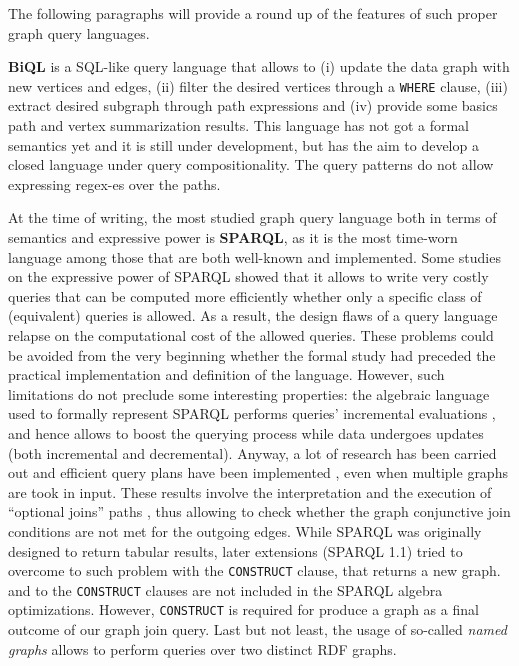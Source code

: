 The following paragraphs will provide a round up of the features of such proper graph query languages.


\textbf{BiQL} \cite{BiQL,BiQL2} is a SQL-like query language that allows to (i) update the data graph with new vertices
and edges, (ii) filter the desired vertices through a \texttt{WHERE} clause, (iii) extract desired subgraph through
path expressions and (iv) provide some basics path and vertex summarization results. This language has not got a
formal semantics yet and it is still under development, but has the aim to develop a closed language under query
compositionality. The query patterns do not allow expressing regex-es over the paths.


At the time of writing, the most studied graph query language  both in terms of
semantics and expressive power is \textbf{SPARQL}, as it is the most time-worn language among those that are both well-known
and implemented. Some studies on the expressive power of SPARQL \cite{SparQLExpr,Perez2009} showed that
it allows to write very costly queries that can be computed more
efficiently whether only a specific class of (equivalent) queries is allowed. As a result, the design flaws
of a query language relapse on the computational cost of the allowed queries. These problems could be avoided
from the very beginning whether the formal study had preceded the practical implementation and definition of the language.
However, such limitations do not preclude some interesting properties: the algebraic language used to
formally represent SPARQL performs queries' incremental evaluations \cite{SparqlIncr}, and hence
allows to boost the querying process while data undergoes updates (both incremental and decremental).
Anyway, a lot of research has been carried out \cite{Perez2009} and efficient query plans have been implemented \cite{sparqlScalable}, even when multiple
graphs are took in input.
These results involve the interpretation and the  execution of ``optional  joins''  paths \cite{SIGMOD2015Atre},
thus allowing to check whether the graph conjunctive join conditions are not met for the outgoing edges.
While SPARQL was originally designed to return tabular results,
later extensions (SPARQL 1.1) tried to overcome to such problem with the \texttt{CONSTRUCT} clause,
that returns a new graph.
and to the \texttt{CONSTRUCT} clauses are not included in the SPARQL algebra optimizations.
However, \texttt{CONSTRUCT} is required for produce a graph as a final outcome of our
graph join query.
Last but not least, the usage of so-called \textit{named graphs}
allows to perform queries over two distinct RDF graphs.

